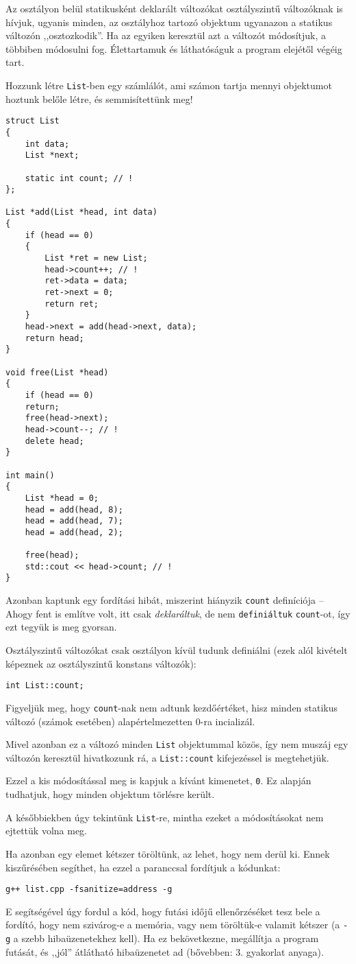 \documentclass[a4paper,11.5pt]{article}
\begin{document}
	\smallskip
	Az osztályon belül statikusként deklarált változókat osztályszintű változóknak is hívjuk, ugyanis minden, az osztályhoz tartozó objektum ugyanazon a statikus változón ,,osztozkodik''. Ha az egyiken keresztül azt a változót módosítjuk, a többiben módosulni fog. Élettartamuk és láthatóságuk a program elejétől végéig tart.
	
	Hozzunk létre \texttt{List}-ben egy számlálót, ami számon tartja mennyi objektumot hoztunk belőle létre, és semmisítettünk meg!
	\begin{lstlisting}
struct List
{
	int data;
	List *next;
	
	static int count; // !
};

List *add(List *head, int data)
{
	if (head == 0)
	{
		List *ret = new List;
		head->count++; // !
		ret->data = data;
		ret->next = 0;
		return ret;
	}
	head->next = add(head->next, data);
	return head;
}

void free(List *head)
{
	if (head == 0)
	return;
	free(head->next);
	head->count--; // !
	delete head;
}

int main()
{
	List *head = 0;
	head = add(head, 8);
	head = add(head, 7);
	head = add(head, 2);
	
	free(head);
	std::cout << head->count; // !
}
	\end{lstlisting}
	Azonban kaptunk egy fordítási hibát, miszerint hiányzik \texttt{count} definíciója -- Ahogy fent is említve volt, itt csak \textit{deklaráltuk}, de nem \texttt{definiáltuk} \texttt{count}-ot, így ezt tegyük is meg gyorsan.
	
	Osztályszintű változókat csak osztályon kívül tudunk definiálni (ezek alól kivételt képeznek az osztályszintű konstans változók):
	\begin{lstlisting}
int List::count;
	\end{lstlisting}
	Figyeljük meg, hogy \texttt{count}-nak nem adtunk kezdőértéket, hisz minden statikus változó (számok esetében) alapértelmezetten 0-ra incializál.
	\smallskip
	
	Mivel azonban ez a változó minden \texttt{List} objektummal közös, így nem muszáj egy változón keresztül hivatkozunk rá, a \texttt{List::count} kifejezéssel is megtehetjük.
	\medskip
	
	Ezzel a kis módosítással meg is kapjuk a kívánt kimenetet, \texttt{0}. Ez alapján tudhatjuk, hogy minden objektum törlésre került.
	\begin{note}
		A későbbiekben úgy tekintünk \texttt{List}-re, mintha ezeket a módosításokat nem ejtettük volna meg.
	\end{note}
	Ha azonban egy elemet kétszer töröltünk, az lehet, hogy nem derül ki. Ennek kiszűrésében segíthet, ha ezzel a paranccsal fordítjuk a kódunkat:
	\begin{center}
		\texttt{g++ list.cpp -fsanitize=address -g}
	\end{center}
	E segítségével úgy fordul a kód, hogy futási időjű ellenőrzéséket tesz bele a fordító, hogy nem szivárog-e a memória, vagy nem töröltük-e valamit kétszer (a \texttt{-g} a szebb hibaüzenetekhez kell). Ha ez bekövetkezne, megállítja a program futását, és ,,jól'' átlátható hibaüzenetet ad (bővebben: 3. gyakorlat anyaga). 
	
\end{document}

